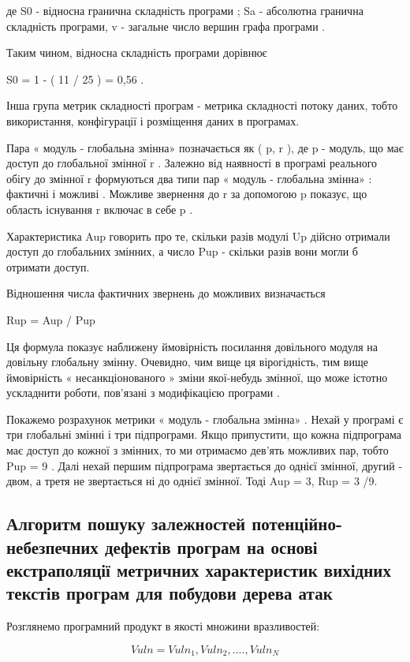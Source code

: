 де S0 - відносна гранична складність програми ; Sa - абсолютна гранична складність програми, v - загальне число вершин графа програми .

Таким чином, відносна складність програми дорівнює

S0 = 1 - ( 11 / 25 ) = 0,56 .

Інша група метрик складності програм - метрика складності потоку даних, тобто використання, конфігурації і розміщення даних в програмах.

Пара « модуль - глобальна змінна» позначається як ( p, r ), де p - модуль, що має доступ до глобальної змінної r . Залежно від наявності в програмі реального обігу до змінної r формуються два типи пар « модуль - глобальна змінна» : фактичні і можливі . Можливе звернення до r за допомогою p показує, що область існування r включає в себе p .

Характеристика Aup говорить про те, скільки разів модулі Up дійсно отримали доступ до глобальних змінних, а число Pup - скільки разів вони могли б отримати доступ.

Відношення числа фактичних звернень до можливих визначається

Rup = Aup / Pup

Ця формула показує наближену ймовірність посилання довільного модуля на довільну глобальну змінну. Очевидно, чим вище ця вірогідність, тим вище ймовірність « несанкціонованого » зміни якої-небудь змінної, що може істотно ускладнити роботи, пов'язані з модифікацією програми .

Покажемо розрахунок метрики « модуль - глобальна змінна» . Нехай у програмі є три глобальні змінні і три підпрограми. Якщо припустити, що кожна підпрограма має доступ до кожної з змінних, то ми отримаємо дев'ять можливих пар, тобто Pup = 9 . Далі нехай першим підпрограма звертається до однієї змінної, другий - двом, а третя не звертається ні до однієї змінної. Тоді Aup = 3, Rup = 3 /9.

\subsection{Алгоритм пошуку залежностей потенційно-небезпечних дефектів програм на основі екстраполяції метричних характеристик вихідних текстів програм для побудови дерева атак}
\label{2section:id13}

Розглянемо програмний продукт в якості множини вразливостей:

\begin{equation}
 Vuln = {Vuln_1,Vuln_2,....,Vuln_N}
\end{equation}

